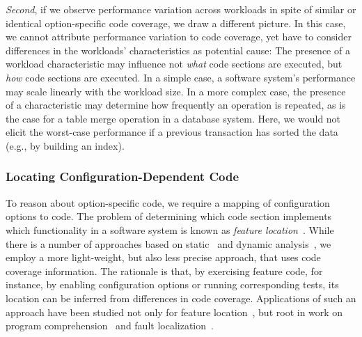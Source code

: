 {{{\textit{Second}, if we observe performance variation across workloads in spite of similar or identical option-specific code coverage, we draw a different picture. In this case, we cannot attribute performance variation to code coverage, yet have to consider differences in the workloads’ characteristics as potential cause: The presence of a workload characteristic may influence not  \emph{what} code sections are executed, but \emph{how} code sections are executed. In a simple case, a software system’s performance may scale linearly with the workload size. In a more complex case, the presence of a characteristic may determine how frequently an operation is repeated, as is the case for a table merge operation in a database system. Here, we would not elicit the worst-case performance if a previous transaction has sorted the data (e.g., by building an index).
\color{black}

\subsubsection{Locating Configuration-Dependent Code}
To reason about option-specific code, we require a mapping of configuration options to code. 
The problem of determining which code section implements which functionality in a software system is known as \emph{feature location}~\cite{rubin_feature_2013}. 
While there is a number of approaches based on static~\cite{velez_2020_configcrusher_jase,lillack_2018_lotrack_tse,luo_2019_cova} and dynamic analysis~\cite{bell_phosphor_2014,velez_comprex_2021,splat_kim_2013}, we employ a more light-weight,  but also less precise approach, that uses code coverage information.
The rationale is that, by exercising feature code, for instance, by enabling configuration options or running corresponding tests, its location can be inferred from differences in code coverage. 
Applications of such an approach have been studied not only for feature location~\cite{wong_integrated_2005,sulir_annotation_2015,michelon_spectrum_2021,perez_framing_2016}, but root in work on program comprehension~\cite{wilde_early_1996,wilde_reconnaissance_1995,sherwood_reducing_nodate,perez_diagnosis_2014,castro_pangolin_2019} and fault localization~\cite{agrawal_fault_1995,wong_faultloc_2016}. 


}}}
